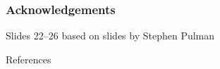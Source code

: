 \documentclass{beamer}
\begin{document}
\begin{frame}

\frametitle{Acknowledgements}

Slides 22--26 based on slides by Stephen Pulman

\end{frame}




\begin{frame}[allowframebreaks]{References}

\small





\end{frame}
\end{document}
